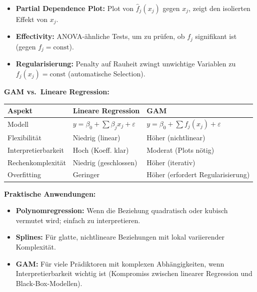 \begin{itemize}[leftmargin=1.5em]
    \item \textbf{Partial Dependence Plot:} Plot von $\hat{f}_j(x_j)$ gegen $x_j$, zeigt den isolierten Effekt von $x_j$.
    \item \textbf{Effectivity:} ANOVA-ähnliche Tests, um zu prüfen, ob $f_j$ signifikant ist (gegen $f_j = \text{const}$).
    \item \textbf{Regularisierung:} Penalty auf Rauheit zwingt unwichtige Variablen zu $f_j(x_j) = \text{const}$ (automatische Selection).
\end{itemize}

\textbf{GAM vs.\ Lineare Regression:}
\begin{table}[h]
    \centering
    \small
    \begin{tabular}{|l|l|l|}
        \hline
        \textbf{Aspekt}     & \textbf{Lineare Regression}                    & \textbf{GAM}                                \\
        \hline
        Modell              & $y = \beta_0 + \sum \beta_j x_j + \varepsilon$ & $y = \beta_0 + \sum f_j(x_j) + \varepsilon$ \\
        \hline
        Flexibilität        & Niedrig (linear)                               & Höher (nichtlinear)                         \\
        \hline
        Interpretierbarkeit & Hoch (Koeff. klar)                             & Moderat (Plots nötig)                       \\
        \hline
        Rechenkomplexität   & Niedrig (geschlossen)                          & Höher (iterativ)                            \\
        \hline
        Overfitting         & Geringer                                       & Höher (erfordert Regularisierung)           \\
        \hline
    \end{tabular}
\end{table}


\textbf{Praktische Anwendungen:}
\begin{itemize}[leftmargin=1.5em]
    \item \textbf{Polynomregression:} Wenn die Beziehung quadratisch oder kubisch vermutet wird; einfach zu interpretieren.
    \item \textbf{Splines:} Für glatte, nichtlineare Beziehungen mit lokal variierender Komplexität.
    \item \textbf{GAM:} Für viele Prädiktoren mit komplexen Abhängigkeiten, wenn Interpretierbarkeit wichtig ist (Kompromiss zwischen linearer Regression und Black-Box-Modellen).
\end{itemize}

